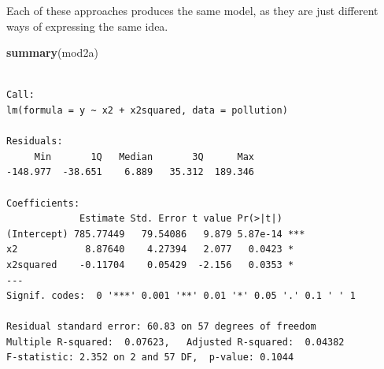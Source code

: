 \documentclass[]{book}
\newenvironment{Shaded}{\begin{snugshade}}{\end{snugshade}}
\newcommand{\KeywordTok}[1]{\textcolor[rgb]{0.13,0.29,0.53}{\textbf{#1}}}
\newcommand{\DataTypeTok}[1]{\textcolor[rgb]{0.13,0.29,0.53}{#1}}
\newcommand{\DecValTok}[1]{\textcolor[rgb]{0.00,0.00,0.81}{#1}}
\newcommand{\StringTok}[1]{\textcolor[rgb]{0.31,0.60,0.02}{#1}}
\newcommand{\OtherTok}[1]{\textcolor[rgb]{0.56,0.35,0.01}{#1}}
\newcommand{\OperatorTok}[1]{\textcolor[rgb]{0.81,0.36,0.00}{\textbf{#1}}}
\newcommand{\NormalTok}[1]{#1}
\theoremstyle{definition}
\theoremstyle{definition}
\theoremstyle{definition}
\theoremstyle{remark}
\begin{document}
\begin{Shaded}
\end{Shaded}

Each of these approaches produces the same model, as they are just
different ways of expressing the same idea.

\begin{Shaded}
\begin{Highlighting}[]
\KeywordTok{summary}\NormalTok{(mod2a)}
\end{Highlighting}
\end{Shaded}

\begin{verbatim}

Call:
lm(formula = y ~ x2 + x2squared, data = pollution)

Residuals:
     Min       1Q   Median       3Q      Max 
-148.977  -38.651    6.889   35.312  189.346 

Coefficients:
             Estimate Std. Error t value Pr(>|t|)    
(Intercept) 785.77449   79.54086   9.879 5.87e-14 ***
x2            8.87640    4.27394   2.077   0.0423 *  
x2squared    -0.11704    0.05429  -2.156   0.0353 *  
---
Signif. codes:  0 '***' 0.001 '**' 0.01 '*' 0.05 '.' 0.1 ' ' 1

Residual standard error: 60.83 on 57 degrees of freedom
Multiple R-squared:  0.07623,   Adjusted R-squared:  0.04382 
F-statistic: 2.352 on 2 and 57 DF,  p-value: 0.1044
\end{verbatim}
\end{document}
